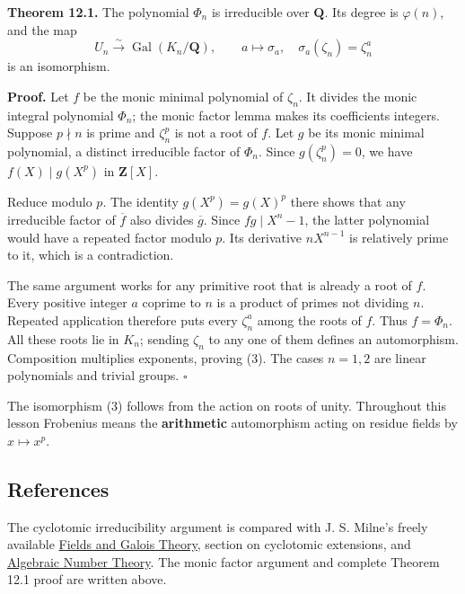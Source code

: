 \documentclass[11pt,a4paper]{article}
\begin{document}
\textbf{Theorem 12.1.} The polynomial \(\Phi_n\) is irreducible over
\(\mathbf Q\). Its degree is \(\varphi(n)\), and the map \[
U_n\xrightarrow{\sim}\operatorname{Gal}(K_n/\mathbf Q),
\qquad a\longmapsto\sigma_a,\quad \sigma_a(\zeta_n)=\zeta_n^a
\tag{3}
\] is an isomorphism.

\textbf{Proof.} Let \(f\) be the monic minimal polynomial of
\(\zeta_n\). It divides the monic integral polynomial \(\Phi_n\); the
monic factor lemma makes its coefficients integers. Suppose \(p\nmid n\)
is prime and \(\zeta_n^p\) is not a root of \(f\). Let \(g\) be its
monic minimal polynomial, a distinct irreducible factor of \(\Phi_n\).
Since \(g(\zeta_n^p)=0\), we have \(f(X)\mid g(X^p)\) in
\(\mathbf Z[X]\).

Reduce modulo \(p\). The identity \(g(X^p)=g(X)^p\) there shows that any
irreducible factor of \(\overline f\) also divides \(\overline g\).
Since \(fg\mid X^n-1\), the latter polynomial would have a repeated
factor modulo \(p\). Its derivative \(nX^{n-1}\) is relatively prime to
it, which is a contradiction.

The same argument works for any primitive root that is already a root of
\(f\). Every positive integer \(a\) coprime to \(n\) is a product of
primes not dividing \(n\). Repeated application therefore puts every
\(\zeta_n^a\) among the roots of \(f\). Thus \(f=\Phi_n\). All these
roots lie in \(K_n\); sending \(\zeta_n\) to any one of them defines an
automorphism. Composition multiplies exponents, proving (3). The cases
\(n=1,2\) are linear polynomials and trivial groups. \(\square\)

The isomorphism (3) follows from the action on roots of unity.
Throughout this lesson Frobenius means the \textbf{arithmetic}
automorphism acting on residue fields by \(x\mapsto x^p\).

\subsection{References}\label{references}

The cyclotomic irreducibility argument is compared with J. S. Milne's
freely available
\href{https://www.jmilne.org/math/CourseNotes/FT.pdf}{Fields and Galois
Theory}, section on cyclotomic extensions, and
\href{https://www.jmilne.org/math/CourseNotes/ANT.pdf}{Algebraic Number
Theory}. The monic factor argument and complete Theorem 12.1 proof are
written above.
\end{document}
